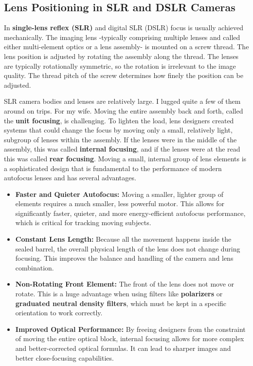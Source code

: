 \documentclass[
  letterpaper,
]{book}
\providecommand{\tightlist}{%
  \setlength{\itemsep}{0pt}\setlength{\parskip}{0pt}}\usepackage{longtable,booktabs,array}
\begin{document}
\subsection{Lens Positioning in SLR and DSLR
Cameras}\label{sec-lens-positioning-slr}

In \textbf{single-lens reflex (SLR)} and digital SLR (DSLR) focus is
usually achieved mechanically. The imaging lens -typically comprising
multiple lenses and called either multi-element optics or a lens
assembly- is mounted on a screw thread. The lens position is adjusted by
rotating the assembly along the thread. The lenses are typically
rotationally symmetric, so the rotation is irrelevant to the image
quality. The thread pitch of the screw determines how finely the
position can be adjusted.

SLR camera bodies and lenses are relatively large. I lugged quite a few
of them around on trips. For my wife. Moving the entire assembly back
and forth, called the \textbf{unit focusing}, is challenging. To lighten
the load, lens designers created systems that could change the focus by
moving only a small, relatively light, subgroup of lenses within the
assembly. If the lenses were in the middle of the assembly, this was
called \textbf{internal focusing}, and if the lenses were at the read
this was called \textbf{rear focusing}. Moving a small, internal group
of lens elements is a sophisticated design that is fundamental to the
performance of modern autofocus lenses and has several advantages.

\begin{itemize}
\tightlist
\item
  \textbf{Faster and Quieter Autofocus:} Moving a smaller, lighter group
  of elements requires a much smaller, less powerful motor. This allows
  for significantly faster, quieter, and more energy-efficient autofocus
  performance, which is critical for tracking moving subjects.
\item
  \textbf{Constant Lens Length:} Because all the movement happens inside
  the sealed barrel, the overall physical length of the lens does not
  change during focusing. This improves the balance and handling of the
  camera and lens combination.
\item
  \textbf{Non-Rotating Front Element:} The front of the lens does not
  move or rotate. This is a huge advantage when using filters like
  \textbf{polarizers} or \textbf{graduated neutral density filters},
  which must be kept in a specific orientation to work correctly.
\item
  \textbf{Improved Optical Performance:} By freeing designers from the
  constraint of moving the entire optical block, internal focusing
  allows for more complex and better-corrected optical formulas. It can
  lead to sharper images and better close-focusing capabilities.
\end{itemize}
\end{document}

